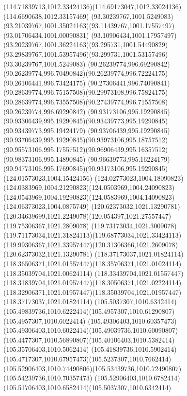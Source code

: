 {    \curveto(114.71839713,1012.33424136)(114.69173047,1012.33024136)(114.6690638,1012.33157469)
    \moveto(93.30239767,1001.5249083)
    \curveto(93.21039767,1001.35024163)(93.11439767,1001.17557497)(93.01706434,1001.00090831)
    \curveto(93.10906434,1001.17957497)(93.20239767,1001.36224163)(93.295731,1001.54490829)
    \curveto(93.29839767,1001.53957496)(93.299731,1001.53157496)(93.30239767,1001.5249083)
    \moveto(90.26239774,996.69290842)
    \curveto(90.26239774,996.70490842)(90.26239774,996.72224175)(90.26106441,996.73424175)
    \curveto(90.27306441,996.74090841)(90.28639774,996.75157508)(90.29973108,996.75824175)
    \curveto(90.28639774,996.73557508)(90.27439774,996.71557508)(90.26239774,996.69290842)
    \moveto(90.93173106,995.19290845)
    \curveto(90.93306439,995.19290845)(90.93439773,995.19290845)(90.93439773,995.19424179)
    \curveto(90.93706439,995.19290845)(90.93706439,995.19290845)(90.93973106,995.18757512)
    \curveto(90.95573106,995.17557512)(90.96906439,995.16357512)(90.98373106,995.14890845)
    \curveto(90.96639773,995.16224179)(90.94773106,995.17690845)(90.93173106,995.19290845)
    \moveto(124.01573023,1004.15424156)
    \curveto(124.02773023,1004.18090823)(124.0383969,1004.21290823)(124.0503969,1004.24090823)
    \curveto(124.0543969,1004.19290823)(124.0583969,1004.14090823)(124.06373023,1004.0875749)
    \closepath
    \moveto(120.62373032,1021.13290781)
    \curveto(120.34639699,1021.2249078)(120.054397,1021.27557447)(119.75306367,1021.2809078)
    \curveto(119.73173034,1021.3009078)(119.71173034,1021.31824113)(119.68773034,1021.33424113)
    \curveto(119.99306367,1021.33957447)(120.31306366,1021.2609078)(120.62373032,1021.13290781)
    \moveto(118.37173037,1021.01824114)
    \curveto(118.36506371,1021.01557447)(118.35706371,1021.01024114)(118.35039704,1021.00624114)
    \curveto(118.33439704,1021.01557447)(118.31839704,1021.01957447)(118.30506371,1021.02224114)
    \curveto(118.32906371,1021.01957447)(118.35039704,1021.01957447)(118.37173037,1021.01824114)
    \moveto(105.5037307,1010.6342414)
    \curveto(105.49839736,1010.6222414)(105.4957307,1010.61290807)(105.4957307,1010.6022414)
    \curveto(105.49306403,1010.60357473)(105.49306403,1010.6022414)(105.49039736,1010.60090807)
    \curveto(105.4477307,1010.56890807)(105.40106403,1010.5382414)(105.35706403,1010.5062414)
    \curveto(105.41839736,1010.5902414)(105.4717307,1010.67957473)(105.5237307,1010.7662414)
    \curveto(105.52906403,1010.74490806)(105.53439736,1010.72490807)(105.54239736,1010.70357473)
    \curveto(105.52906403,1010.6782414)(105.51706403,1010.6582414)(105.5037307,1010.6342414)
}
